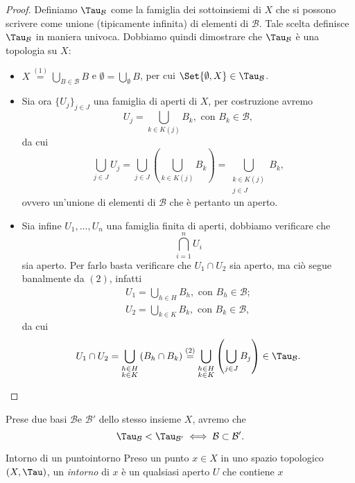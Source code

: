 \begin{proof}
    Definiamo \(\Tau_{\mathcal{B}}\) come la famiglia dei sottoinsiemi di \(X\) che si possono scrivere come unione (tipicamente infinita) di elementi di \(\mathcal{B}\).
    Tale scelta definisce \(\Tau_{\mathcal{B}}\) in maniera univoca.
    Dobbiamo quindi dimostrare che \(\Tau_{\mathcal{B}}\) è una topologia su \(X\):
    \begin{itemize}
        \item \(\displaystyle X\overset{(1)}{=}\bigcup_{B\in\mathcal{B}}B\) e \(\displaystyle\emptyset=\bigcup_\emptyset B\), per cui \(\Set{\emptyset,X}\in\Tau_{\mathcal{B}}\).
        \item Sia ora \(\{U_j\}_{j\in J}\) una famiglia di aperti di \(X\), per costruzione avremo
              \[
                  U_j=\bigcup_{k\in K(j)}B_k,\text{ con }B_k\in\mathcal{B},
              \]
              da cui
              \[
                  \bigcup_{j\in J}U_j=\bigcup_{j\in J}\left(\bigcup_{k\in K(j)}B_k\right)=\bigcup_{\substack{k\in K(j)\\j\in J}}B_k,
              \]
              ovvero un'unione di elementi di \(\mathcal{B}\) che è pertanto un aperto.
        \item Sia infine \(U_1,\dots,U_n\) una famiglia finita di aperti, dobbiamo verificare che
              \[
                  \bigcap_{i=1}^n U_i
              \]
              sia aperto.
              Per farlo basta verificare che \(U_1\cap U_2\) sia aperto, ma ciò segue banalmente da \((2)\), infatti
              \begin{gather*}
                  U_1=\bigcup_{h\in H}B_h,\text{ con }B_h\in\mathcal{B};\\
                  U_2=\bigcup_{k\in K}B_k,\text{ con }B_k\in\mathcal{B},
              \end{gather*}
              da cui
              \[
                  U_1\cap U_2=\bigcup_{\substack{h\in H\\k\in K}}\left(B_h\cap B_k\right)\overset{(2)}{=}\bigcup_{\substack{h\in H\\k\in K}}\left(\bigcup_{j\in J}B_j\right)\in\Tau_{\mathcal{B}}.\qedhere
              \]
    \end{itemize}
\end{proof}

\begin{oss}
    Prese due basi \(\mathcal{B}\)e \(\mathcal{B}'\) dello stesso insieme \(X\), avremo che
    \[
        \Tau_{\mathcal{B}}<\Tau_{\mathcal{B}'}\iff \mathcal{B}\subset\mathcal{B}'.
    \]
\end{oss}
%
%
\begin{defn}{Intorno di un punto}{intorno}
    Preso un punto \(x\in X\) in uno spazio topologico \((X,\Tau)\), un \emph{intorno} di \(x\) è un qualsiasi aperto \(U\) che contiene \(x\)
\end{defn}

